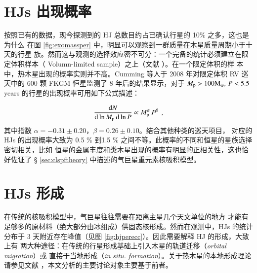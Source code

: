 \section{HJs 出现概率}  \label{sec:hjoccurate}

按照已有的数据，现今探测到的 HJ 总数目约占已确认行星的 10\% 之多，这也是为什么
在图 \ref{fig:exomassper} 中，明显可以观察到一群质量在木星质量周期小于十天的行星
族。然而这与观测的选择效应密不可分：一个完备的统计必须建立在限定体积样本（
Volumn-limited sample）之上（文献 ）。在一个限定体积的样
本中，热木星出现的概率实则并不高。Cumming 等人于 2008 年对限定体积 RV 巡天中的 600 
颗 FKGM 恒星监测了 8 年后的结果显示\cite{Cumming2008}，对于
 $M_\mathrm{p} > 100 \mathrm{M}_\oplus,\, P<5.5$ years 的行星的出现概率可用如下公式描述：
 
\begin{equation} \label{eq:pltoccurate}
\frac{\mathrm{d} N}{\mathrm{d}\ln M_\mathrm{p} \,\mathrm{d}\ln P} \propto  M_\mathrm{p}^\alpha \,P^\beta \ \, ,
\end{equation} 
其中指数 $\alpha = -0.31 \pm 0.20 $，$\beta = 0.26 \pm 0.10$。结合其他种类的巡天项目，
对应的 HJs 的出现概率大致为 0.5 \% 到1.5 \% 之间不等\cite{Howard2012,Marcy2005,
Mayor2011,Wright2012}。此概率的不同和恒星的星族选择密切相关\cite{Wright2012}，比如
恒星的金属丰度和类木星出现的概率有明显的正相关性\cite{Gonzalez1997,Santos2001,
Santos2004,Fischer2005,Udry2007,Sozzetti2009,Sousa2011}，这也恰好佐证了 \S 
\ref{sec:clspftheory} 中描述的气巨星重元素核吸积模型。


\section{HJs 形成} \label{sec:hjform}


在传统的核吸积模型中\cite{IdaLin2004b}，气巨星往往需要在距离主星几个天文单位的地方
才能有足够多的原材料（绝大部分由冰组成）供固态核形成。然而在观测中，HJs 的统计
分布于 3 天附近存在峰值（见图 \ref{fig:hjperecc}）。因此需要解释 HJ 的形成，大致上有
两大种途径：在传统的行星形成基础上引入木星的轨道迁移（\textit{orbital migration}）或
直接于当地形成（\textit{in situ. formation}）。关于热木星的本地形成理论请参见文献 
，本文分析的主要讨论对象主要基于前者。

